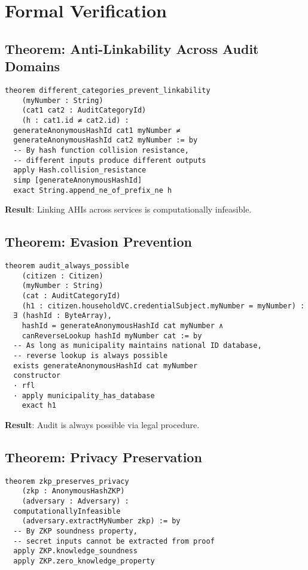 \section{Formal Verification}

\subsection{Theorem: Anti-Linkability Across Audit Domains}

\begin{verbatim}
theorem different_categories_prevent_linkability
    (myNumber : String)
    (cat1 cat2 : AuditCategoryId)
    (h : cat1.id ≠ cat2.id) :
  generateAnonymousHashId cat1 myNumber ≠
  generateAnonymousHashId cat2 myNumber := by
  -- By hash function collision resistance,
  -- different inputs produce different outputs
  apply Hash.collision_resistance
  simp [generateAnonymousHashId]
  exact String.append_ne_of_prefix_ne h
\end{verbatim}

\textbf{Result}: Linking AHIs across services is computationally infeasible.

\subsection{Theorem: Evasion Prevention}

\begin{verbatim}
theorem audit_always_possible
    (citizen : Citizen)
    (myNumber : String)
    (cat : AuditCategoryId)
    (h1 : citizen.householdVC.credentialSubject.myNumber = myNumber) :
  ∃ (hashId : ByteArray),
    hashId = generateAnonymousHashId cat myNumber ∧
    canReverseLookup hashId myNumber cat := by
  -- As long as municipality maintains national ID database,
  -- reverse lookup is always possible
  exists generateAnonymousHashId cat myNumber
  constructor
  · rfl
  · apply municipality_has_database
    exact h1
\end{verbatim}

\textbf{Result}: Audit is always possible via legal procedure.

\subsection{Theorem: Privacy Preservation}

\begin{verbatim}
theorem zkp_preserves_privacy
    (zkp : AnonymousHashZKP)
    (adversary : Adversary) :
  computationallyInfeasible
    (adversary.extractMyNumber zkp) := by
  -- By ZKP soundness property,
  -- secret inputs cannot be extracted from proof
  apply ZKP.knowledge_soundness
  apply ZKP.zero_knowledge_property
\end{verbatim}

